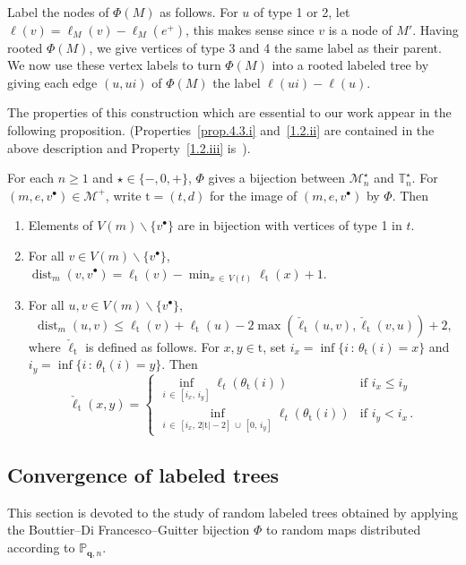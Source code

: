 \documentclass[AHL,Unicode,longabstracts,published]{cedram}
\newcommand{\bbP}{\mathbb{P}}
\newcommand{\bbT}{\mathbb{T}}
\newcommand{\bfq}{\mathbf{q}}
\newcommand{\cM}{\mathcal{M}}
\newcommand{\rt}{\mathrm{t}}
\DeclareMathOperator{\dist}{dist}
\newcommand{\sbt}{{\ensuremath{\scriptscriptstyle\bullet}}}
\newcommand*{\romanenumi}{\renewcommand*{\theenumi}{\roman{enumi}}}
\begin{document}
Label the nodes of $\Phi(M)$ as follows. For $u$ of type 1 or 2, let $\ell(v)=\ell_M(v)-\ell_M(e^+)$, this makes sense since $v$ is a node of $M'$. Having rooted $\Phi(M)$, we give vertices of type 3 and 4 the same label as their parent. We now use these vertex labels to turn $\Phi(M)$ into a rooted labeled tree by giving each edge $(u,ui)$ of $\Phi(M)$ the label $\ell(ui)-\ell(u)$.

The properties of this construction which are essential to our work appear in the following proposition. (Properties~\eqref{prop.4.3.i} and~\eqref{1.2.ii} are contained in the above description and Property~\eqref{1.2.iii} is~\cite[Lemma~3.1]{LeGallInventiones}).

\begin{prop}\label{prop:BDG}
For each $n\geq 1$ and $\star\in\{-,0,+\}$, $\Phi$ gives a bijection between $\cM_n^\star$ and $\bbT_{n}^\star$. For $(m,e,v^\sbt) \in \cM^+$, write $\rt=(t,d)$ for the image of $(m,e,v^\sbt)$ by $\Phi$. Then
\begin{enumerate}\romanenumi
\item \label{prop.4.3.i} Elements of $V(m)\backslash \{v^\sbt\}$ are in bijection with vertices of type 1 in $t$.
\item \label{prop.4.3.ii}For all $v\in V(m)\backslash \{v^\sbt\}$, $\dist_m(v,v^\sbt) = \ell_\rt(v)-\min_{x\,\in\,V(t)}\ell_\rt(x)+1$.
\item \label{prop.4.3.iii} For all $u,v \in V(m)\backslash \{v^\sbt\}$,
\[
\dist_m(u,v) \leq \ell_\rt(v) + \ell_\rt(u) - 2 \max\left(
\check \ell_\rt\left(u,v\right),\check \ell_\rt\left(v,u\right)\right)+2,
\]
where $\check \ell_\rt$ is defined as follows. For $x,y \in \rt$, set $i_x=\inf\{i\,:\,\theta_\rt(i)=x\}$ and $i_y=\inf\{i\,:\,\theta_\rt(i)=y\}$. Then
\[
\check\ell_\rt\left(x,y\right)=
\begin{cases}
\inf_{i\,\in\,[i_x,\,i_y]}\ell_t(\theta_\rt(i))&\text{if }i_x\leq i_{y}\\
\inf_{i\,\in\,\left[i_x,\,2|\rt|-2\right]\,\cup\,[0,\,i_y]}\ell_t(\theta_\rt(i))&\text{if }i_y< i_{x}\,.
\end{cases}
\]
\end{enumerate}
\end{prop}

\subsection{Convergence of labeled trees}\label{sub:invariance}
This section is devoted to the study of random labeled trees obtained by applying the Bouttier--Di Francesco--Guitter bijection $\Phi$ to random maps distributed according to $\bbP_{\bfq,n}$.
\end{document}
